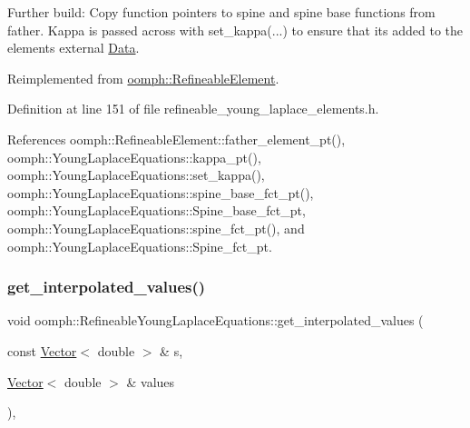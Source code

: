 Further build\+: Copy function pointers to spine and spine base functions from father. Kappa is passed across with set\+\_\+kappa(...) to ensure that it\textquotesingle{}s added to the element\textquotesingle{}s external \hyperlink{classoomph_1_1Data}{Data}. 



Reimplemented from \hyperlink{classoomph_1_1RefineableElement_a26628ce36dfad028686adeb4694a9ef3}{oomph\+::\+Refineable\+Element}.



Definition at line 151 of file refineable\+\_\+young\+\_\+laplace\+\_\+elements.\+h.



References oomph\+::\+Refineable\+Element\+::father\+\_\+element\+\_\+pt(), oomph\+::\+Young\+Laplace\+Equations\+::kappa\+\_\+pt(), oomph\+::\+Young\+Laplace\+Equations\+::set\+\_\+kappa(), oomph\+::\+Young\+Laplace\+Equations\+::spine\+\_\+base\+\_\+fct\+\_\+pt(), oomph\+::\+Young\+Laplace\+Equations\+::\+Spine\+\_\+base\+\_\+fct\+\_\+pt, oomph\+::\+Young\+Laplace\+Equations\+::spine\+\_\+fct\+\_\+pt(), and oomph\+::\+Young\+Laplace\+Equations\+::\+Spine\+\_\+fct\+\_\+pt.

\mbox{\label{classoomph_1_1RefineableYoungLaplaceEquations_ab54a23095ee8aef3fe68542bdfa1400a}} 
\subsubsection{\texorpdfstring{get\+\_\+interpolated\+\_\+values()}{get\_interpolated\_values()}\hspace{0.1cm}{\footnotesize\ttfamily [1/2]}}
{\footnotesize\ttfamily void oomph\+::\+Refineable\+Young\+Laplace\+Equations\+::get\+\_\+interpolated\+\_\+values (\begin{DoxyParamCaption}\item[{const \hyperlink{classoomph_1_1Vector}{Vector}$<$ double $>$ \&}]{s,  }\item[{\hyperlink{classoomph_1_1Vector}{Vector}$<$ double $>$ \&}]{values }\end{DoxyParamCaption})\hspace{0.3cm}{\ttfamily [inline]}, {\ttfamily [virtual]}}




